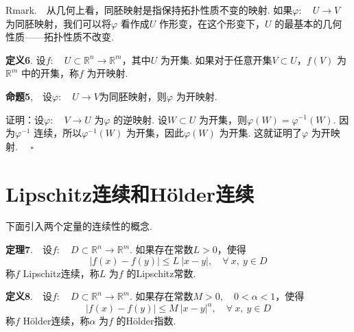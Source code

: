 \documentclass{article}
\begin{document}
\vspace{10pt}

Rmark.\ \ 从几何上看，同胚映射是指保持拓扑性质不变的映射. 如果\(\varphi :\quad U  \to V\) 为同胚映射，我们可以将\(\varphi \) 看作成\(U\) 作形变，在这个形变下，\(U\) 的最基本的几何性质——拓扑性质不改变.

\newpage

\textbf{定义6}. 设\(f:\quad U \subset \mathbb{R}^n \to \mathbb{R}^{m}\)，其中\(U\) 为开集. 如果对于任意开集\(V \subset U\)，\(f(V) \) 为\(\mathbb{R}^{m}\) 中的开集，称\(f\) 为开映射.

\vspace{10pt}

\textbf{命题5},\ \ 设\(\varphi:\quad  U \to V\)为同胚映射，则\(\varphi \) 为开映射.

\vspace{10pt}

证明：设\(\varphi :\quad V \to U\) 为\(\varphi \) 的逆映射. 设\(W \subset U\) 为开集，则\(\varphi(W) = \varphi^{ - 1}(W)\). 因为\(\varphi ^{ - 1}\) 连续，所以\(\varphi ^{ - 1}(W)\) 为开集，因此\(\varphi(W)\) 为开集. 这就证明了\(\varphi \) 为开映射. \(\quad \square\)

\newpage

\section{Lipschitz连续和Hölder连续}
下面引入两个定量的连续性的概念.

\vspace{10pt}

\textbf{定理7}.\ \ 设\(f:\quad D \subset \mathbb{R}^n \to \mathbb{R}^{m}\). 如果存在常数\(L > 0\)，使得
\begin{equation*}
    | f(x) - f(y)  | \le L\ | x - y |,\quad \forall\ x,\ y \in D
\end{equation*}
称\(f\) Lipschitz连续，称\(L\) 为\(f\) 的Lipschitz常数.

\vspace{10pt}

\textbf{定义8}.\ \ 设\(f:\quad D \subset \mathbb{R}^n \to \mathbb{R}^{m}\). 如果存在常数\(M > 0,\quad 0 < \alpha < 1\)，使得
\begin{equation*}
    | f(x) - f(y)  | \le M\ | x - y |^{\alpha },\quad \forall\ x,\ y \in D
\end{equation*}
称\(f\) Hölder连续，称\(\alpha \) 为\(f\) 的Hölder指数.

\vspace{10pt}
\end{document}
